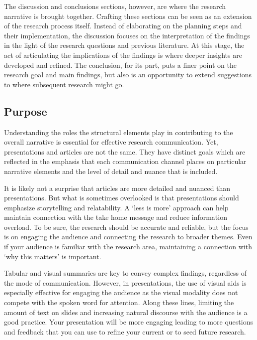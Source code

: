 \documentclass[
  letterpaper,
  krantz1]{latex/krantz-mod}
\theoremstyle{definition}
\theoremstyle{definition}
\theoremstyle{remark}
\begin{document}
The discussion and conclusions sections, however, are where the research
narrative is brought together. Crafting these sections can be seen as an
extension of the research process itself. Instead of elaborating on the
planning steps and their implementation, the discussion focuses on the
interpretation of the findings in the light of the research questions
and previous literature. At this stage, the act of articulating the
implications of the findings is where deeper insights are developed and
refined. The conclusion, for its part, puts a finer point on the
research goal and main findings, but also is an opportunity to extend
suggestions to where subsequent research might go.

\subsection{Purpose}\label{sec-contribute-public-purpose}

Understanding the roles the structural elements play in contributing to
the overall narrative is essential for effective research communication.
Yet, presentations and articles are not the same. They have distinct
goals which are reflected in the emphasis that each communication
channel places on particular narrative elements and the level of detail
and nuance that is included.

It is likely not a surprise that articles are more detailed and nuanced
than presentations. But what is sometimes overlooked is that
presentations should emphasize storytelling and relatability. A `less is
more' approach can help maintain connection with the take home message
and reduce information overload. To be sure, the research should be
accurate and reliable, but the focus is on engaging the audience and
connecting the research to broader themes. Even if your audience is
familiar with the research area, maintaining a connection with `why this
matters' is important.

Tabular and visual summaries are key to convey complex findings,
regardless of the mode of communication. However, in presentations, the
use of visual aids is especially effective for engaging the audience as
the visual modality does not compete with the spoken word for attention.
Along these lines, limiting the amount of text on slides and increasing
natural discourse with the audience is a good practice. Your
presentation will be more engaging leading to more questions and
feedback that you can use to refine your current or to seed future
research.
\end{document}

